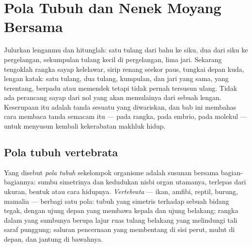 \chapter{Pola Tubuh dan Nenek Moyang Bersama}\label{ch:g10:common-ancestry}

Julurkan lenganmu dan hitunglah: satu tulang dari bahu ke siku, dua
dari siku ke pergelangan, sekumpulan tulang kecil di pergelangan, lima
jari. Sekarang tengoklah rangka sayap kelelawar, sirip renang seekor
paus, tungkai depan kuda, lengan katak: satu tulang, dua tulang, kumpulan,
dan jari yang sama, yang terentang, berpadu atau memendek tetapi tidak
pernah tersusun ulang. Tidak ada perancang sayap dari nol yang akan
memulainya dari sebuah lengan. Keserupaan itu adalah tanda sesuatu yang
diwariskan, dan bab ini membahas cara membaca tanda semacam itu ---
pada rangka, pada embrio, pada molekul --- untuk menyusun kembali
kekerabatan makhluk hidup.

\section{Pola tubuh vertebrata}

\begin{definition}\label{def:g10:common-ancestry:bodyplan}
Yang disebut \emph{pola tubuh} sekelompok organisme
adalah susunan bersama bagian-bagiannya: sumbu simetrinya dan kedudukan
nisbi organ utamanya, terlepas dari ukuran, bentuk atau cara hidupnya.
\emph{Vertebrata} --- ikan, amfibi, reptil, burung,
mamalia --- berbagi satu pola: tubuh yang simetris terhadap sebuah
bidang tegak, dengan ujung depan yang membawa kepala dan ujung
belakang; rangka dalam yang sumbunya berupa lajur ruas tulang belakang
yang melindungi tali saraf punggung; saluran pencernaan yang
membentang di sisi perut, mulut di depan, dan jantung di bawahnya.
\end{definition}

